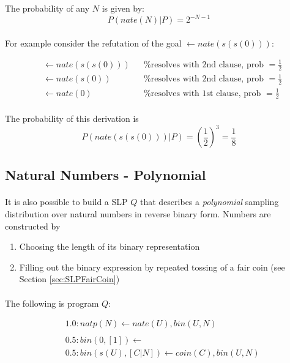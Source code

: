 \documentclass{article}
\theoremstyle{plain}
\theoremstyle{definition}
\begin{document}
\begin{multicols}{2}
\noindent The probability of any $N$ is given by: $$P(nate(N)|P) = 2^{-N-1}$$

\paragraph{} For example consider the refutation of the goal $\leftarrow nate(s(s(0)))$:

{\footnotesize \begin{align*}
&\leftarrow nate(s(s(0))) && \text{\% resolves with 2nd clause, prob } = \frac{1}{2}\\
&\leftarrow nate(s(0)) && \text{\% resolves with 2nd clause, prob } = \frac{1}{2}\\
&\leftarrow nate(0) && \text{\% resolves with 1st clause, prob }= \frac{1}{2}
\end{align*}}

\paragraph{} The probability of this derivation is $$P(nate(s(s(0)))|P) = \left(\frac{1}{2}\right)^3 = \frac{1}{8}$$

\subsection{Natural Numbers - Polynomial}

\paragraph{} It is also possible to build a SLP $Q$ that describes a \textit{polynomial} sampling distribution over natural numbers in reverse binary form\cite[pp. 8-9]{muggleton96}. Numbers are constructed by

\begin{enumerate}
\item Choosing the length of its binary representation
\item Filling out the binary expression by repeated tossing of a fair coin (see Section \ref{sec:SLPFairCoin})
\end{enumerate}

\paragraph{} The following is program $Q$:

\begin{align*}
&1.0: natp(N) \leftarrow nate(U), bin(U, N)\\
\\
&0.5: bin(0, [1]) \leftarrow\\
&0.5: bin(s(U), [C|N]) \leftarrow coin(C), bin(U, N)
\end{align*}


\end{multicols}
\end{document}
